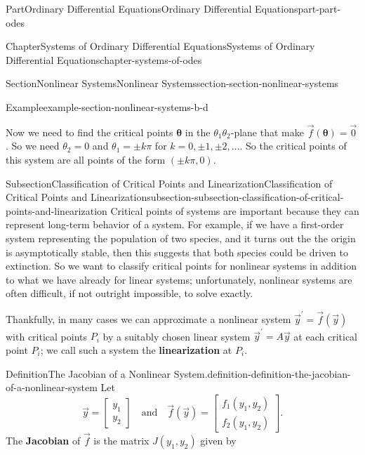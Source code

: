 \documentclass[twoside,10pt,]{book}
\newcommand{\terminology}[1]{\textbf{#1}}
\numberwithin{equation}{part}
\newcommand{\vecm}[1]{\boldsymbol{#1}}
\begin{document}
\begin{partptx}{Part}{Ordinary Differential Equations}{}{Ordinary Differential Equations}{}{}{part-part-odes}
\begin{chapterptx}{Chapter}{Systems of Ordinary Differential Equations}{}{Systems of Ordinary Differential Equations}{}{}{chapter-systems-of-odes}
\begin{sectionptx}{Section}{Nonlinear Systems}{}{Nonlinear Systems}{}{}{section-section-nonlinear-systems}
\begin{introduction}{}
\begin{example}{Example}{}{example-section-nonlinear-systems-b-d}
\begin{equation*}
\end{equation*}
%
\par
Now we need to find the critical points \(\vecm{\theta}\) in the \(\theta_{1}\theta_{2}\)-plane that make \(\vec{f}(\vecm{\theta}) = \vec{0}\). So we need \(\theta_{2} = 0\) and \(\theta_{1} = \pm k\pi\) for \(k=0,\pm1,\pm2,\dots\). So the critical points of this system are all points of the form \((\pm k\pi,0)\).%
\end{example}
\end{introduction}%
%
%
\typeout{************************************************}
\typeout{************************************************}
%
\begin{subsectionptx}{Subsection}{Classification of Critical Points and Linearization}{}{Classification of Critical Points and Linearization}{}{}{subsection-subsection-classification-of-critical-points-and-linearization}
Critical points of systems are important because they can represent long-term behavior of a system. For example, if we have a first-order system representing the population of two species, and it turns out the the origin is asymptotically stable, then this suggests that both species could be driven to extinction. So we want to classify critical points for nonlinear systems in addition to what we have already for linear systems; unfortunately, nonlinear systems are often difficult, if not outright impossible, to solve exactly.%
\par
Thankfully, in many cases we can approximate a nonlinear system \(\vec{y}^\prime = \vec{f}(\vec{y})\) with critical points \(P_{i}\) by a suitably chosen linear system \(\vec{y}^\prime = A\vec{y}\) at each critical point \(P_{i}\); we call such a system the \terminology{linearization} at \(P_{i}\).%
\begin{definition}{Definition}{The Jacobian of a Nonlinear System.}{definition-definition-the-jacobian-of-a-nonlinear-system}%
Let%
\begin{equation*}
\vec{y} = \begin{bmatrix}y_{1} \\ y_{2}\end{bmatrix}\quad\text{and}\quad\vec{f}(\vec{y}) = \begin{bmatrix}f_{1}(y_{1},y_{2}) \\ f_{2}(y_{1},y_{2})\end{bmatrix}.
\end{equation*}
The \terminology{Jacobian} of \(\vec{f}\) is the matrix \(J(y_{1},y_{2})\) given by%

\end{definition}
\end{subsectionptx}
\end{sectionptx}
\end{chapterptx}
\end{partptx}
\end{document}
